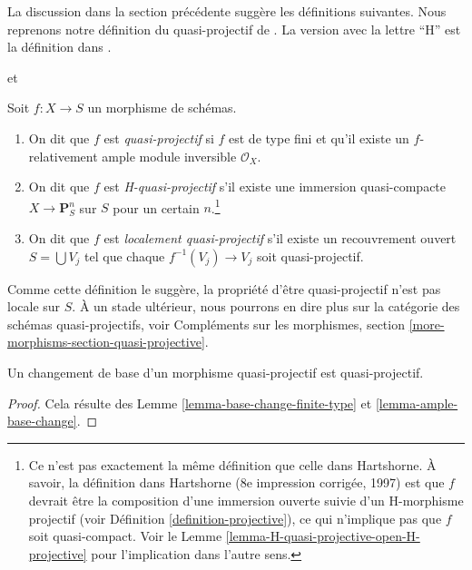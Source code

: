 \noindent
La discussion dans la section précédente suggère les définitions suivantes. Nous reprenons
notre définition du quasi-projectif de \cite{EGA}. La version avec la lettre
``H'' est la définition dans \cite{H}.

\begin{definition}
\label{definition-quasi-projective}
\begin{reference}
\cite[II, Définition 5.3.1]{EGA} et \cite[page 103]{H}
\end{reference}
Soit $f : X \to S$ un morphisme de schémas.
\begin{enumerate}
\item On dit que $f$ est {\it quasi-projectif} si $f$
est de type fini et qu'il existe un $f$-relativement ample module inversible $\mathcal{O}_X$.
\item On dit que $f$ est {\it H-quasi-projectif}
s'il existe une immersion quasi-compacte $X \to \mathbf{P}^n_S$ sur $S$
pour un certain $n$.\footnote{Ce n'est pas exactement la
même définition que celle dans Hartshorne. À savoir, la définition dans Hartshorne
(8e impression corrigée, 1997) est que $f$ devrait être la composition d'une
immersion ouverte suivie d'un H-morphisme projectif (voir Définition \ref{definition-projective}),
ce qui n'implique pas que
$f$ soit quasi-compact. Voir le Lemme \ref{lemma-H-quasi-projective-open-H-projective} pour
l'implication dans l'autre sens.}
\item On dit que $f$ est {\it localement quasi-projectif}
s'il existe un recouvrement ouvert $S = \bigcup V_j$ tel que chaque $f^{-1}(V_j) \to V_j$
soit quasi-projectif.
\end{enumerate}
\end{definition}

\noindent
Comme cette définition le suggère, la propriété d'être quasi-projectif
n'est pas locale sur $S$. À un stade ultérieur, nous
pourrons en dire plus sur la catégorie des schémas
quasi-projectifs, voir Compléments sur les morphismes, section \ref{more-morphisms-section-quasi-projective}.

\begin{lemma}
\label{lemma-base-change-quasi-projective}
Un changement de base d'un morphisme quasi-projectif est quasi-projectif.
\end{lemma}

\begin{proof}
Cela résulte
des Lemme \ref{lemma-base-change-finite-type}
et \ref{lemma-ample-base-change}.
\end{proof}

